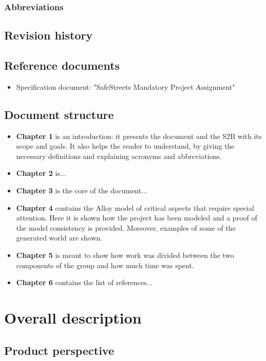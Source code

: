 \documentclass[12pt,a4paper]{report}
\begin{document}
		\subsection{Abbreviations}

	\section{Revision history}

	\section{Reference documents}
	\begin{itemize}
	\item {Specification document}: "SafeStreets Mandatory Project Assignment"
	\end{itemize}

	\section{Document structure}
	\begin{itemize}
	\item \textbf{Chapter 1} is an introduction: it presents the document and the S2B with its scope and goals. It also helps the reader to understand, by giving the necessary definitions and explaining acronyms and abbreviations. 
	\item \textbf{Chapter 2} is...
	\item \textbf{Chapter 3} is the core of the document...
	\item \textbf{Chapter 4} contains the Alloy model of critical aspects that require special attention. Here it is shown how the project has been modeled and a proof of the model consistency is provided. Moreover, examples of some of the generated world are shown.
	\item \textbf{Chapter 5} is meant to show how work was divided between the two components of the group and how much time was spent.
	\item \textbf{Chapter 6} contains the list of references...
	\end{itemize}


\chapter{Overall description}
	\section{Product perspective}
\end{document}
